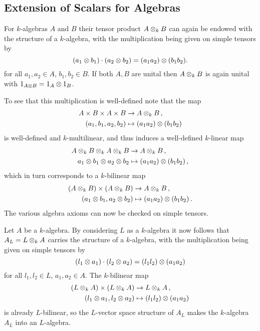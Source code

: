 \subsection{Extension of Scalars for Algebras}


\begin{fluff}
  \label{fluff: tensor product of algebras}
  For $k$-algebras $A$ and $B$ their tensor product $A \mathbin{\otimes}_k B$ can again be endowed with the structure of a $k$-algebra, with the multiplication being given on simple tensors by
  \[
      (a_1 \mathbin{\otimes} b_1) \cdot (a_2 \mathbin{\otimes} b_2)
    = (a_1 a_2) \mathbin{\otimes} (b_1 b_2).
  \]
  for all $a_1, a_2 \in A$, $b_1, b_2 \in B$.
  If both $A, B$ are unital then $A \mathbin{\otimes}_k B$ is again unital with $1_{A \mathbin{\otimes} B} = 1_A \mathbin{\otimes} 1_B$.
  
  To see that this multiplication is well-defined note that the map
  \begin{align*}
              A \times B \times A \times B
    &\to      A \mathbin{\otimes}_k B \,, \\
              (a_1, b_1, a_2, b_2)
    &\mapsto  (a_1 a_2) \mathbin{\otimes} (b_1 b_2)
  \end{align*}
  is well-defined and $k$-multilinear, and thus induces a well-defined $k$-linear map
  \begin{align*}
              A \mathbin{\otimes}_k B \mathbin{\otimes}_k A \mathbin{\otimes}_k B
    &\to      A \mathbin{\otimes}_k B \,, \\
              a_1 \mathbin{\otimes} b_1 \mathbin{\otimes} a_2 \mathbin{\otimes} b_2
    &\mapsto  (a_1 a_2) \mathbin{\otimes} (b_1 b_2) \,,
  \end{align*}
  which in turn corresponds to a $k$-bilinear map
  \begin{align*}
              (A \mathbin{\otimes}_k B) \times (A \mathbin{\otimes}_k B)
    &\to      A \mathbin{\otimes}_k B \,, \\
              (a_1 \mathbin{\otimes} b_1, a_2 \mathbin{\otimes} b_2)
    &\mapsto  (a_1 a_2) \mathbin{\otimes} (b_1 b_2) \,.
  \end{align*}
  The various algebra axioms can now be checked on simple tensors.
\end{fluff}


\begin{fluff}
  Let $A$ be a $k$-algebra.
  By considering $L$ as a $k$-algebra it now follows that $A_L = L \mathbin{\otimes}_k A$ carries the structure of a $k$-algebra, with the multiplication being given on simple tensors by
  \[
      (l_1 \mathbin{\otimes} a_1) \cdot (l_2 \mathbin{\otimes} a_2)
    = (l_1 l_2) \mathbin{\otimes} (a_1 a_2)
  \]
  for all $l_1, l_2 \in L$, $a_1, a_2 \in A$.
  The $k$-bilinear map
  \begin{align*}
              (L\mathbin{\otimes}_k A) \times (L \mathbin{\otimes}_k A)
    &\to      L \mathbin{\otimes}_k A \,, \\
              (l_1 \mathbin{\otimes} a_1, l_2 \mathbin{\otimes} a_2)
    &\mapsto  (l_1 l_2) \mathbin{\otimes} (a_1 a_2)
  \end{align*}
  is already $L$-bilinear, so the $L$-vector space structure of $A_L$ makes the $k$-algebra $A_L$ into an $L$-algebra.
\end{fluff}


